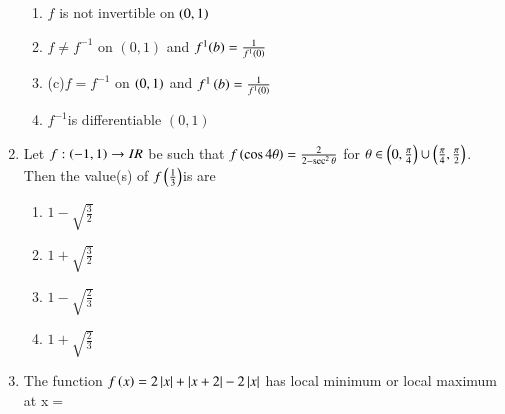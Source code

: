 \documentclass[journal,12pt,twocolumn]{IEEEtran}
\theoremstyle{remark}
\begin{document}
\begin{enumerate}[start=2]
\begin{enumerate}
\item $f$ is not invertible  on $\left(0,1\right)$
\item$f\neq{f^{-1}}$ on $(0,1)$ and $f^{1}(b)=\frac{1}{f^{1}\left(0\right)}$
\item(c)$f=f^{-1}$ on $\left(0,1\right)$ and $f^{1}\left(b\right)=\frac{1}{f^{1}\left(0\right)}$
\item$f^{-1} $is differentiable $(0,1)$
\end{enumerate}
\item Let $f:\left(-1,1\right)\rightarrow{IR}$ be  such that $f\left(\cos{4\theta}\right) =\frac{2}{2-\sec^2{\theta}}$ for $\theta \in \left(0,\frac{\pi}{4}\right)\cup\left(\frac{\pi}{4},\frac{\pi}{2}\right)$. Then the value(s) of $f\left(\frac{1}{3}\right)$is are
\begin{multicols}{2}
\begin{enumerate} 
\item $1-\sqrt{\frac{3}{2}}$  
\item $1+\sqrt{\frac{3}{2}}$
\item $1-\sqrt{\frac{2}{3}}$   
\item $1+\sqrt{\frac{2}{3}}$
\end{enumerate}
\end{multicols}
\item The function $f\left(x\right)=2\left\vert x\right\vert+\left\vert x+2\right\vert-2\left\vert x\right\vert$ has local minimum or local maximum at x$=$


\end{enumerate}
\end{document}
